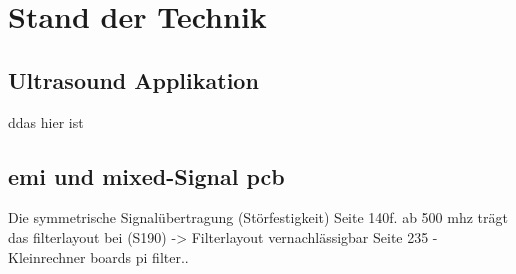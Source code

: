 \chapter{Stand der Technik}
\section{Ultrasound Applikation}
ddas hier ist 

\section{\acs{emi} und mixed-Signal \acs{pcb}}

Die symmetrische Signalübertragung (Störfestigkeit) Seite 140f.
ab 500 \ac{mhz} trägt das filterlayout bei (S190) -> Filterlayout vernachlässigbar
Seite 235 - Kleinrechner boards pi filter..

